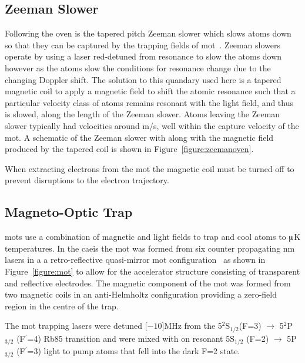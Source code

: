 \subsection{Zeeman Slower}
Following the oven is the tapered pitch Zeeman slower which slows atoms down so that they can be captured by the trapping fields of \gls{mot}~\cite{bell_slow_2010}.
Zeeman slowers operate by using a laser red-detuned from resonance to slow the atoms down however as the atoms slow the conditions for resonance change due to the changing Doppler shift.
The solution to this quandary used here is a tapered magnetic coil to apply a magnetic field to shift the atomic resonance such that a particular velocity class of atoms remains resonant with the light field, and thus is slowed, along the length of the Zeeman slower.
Atoms leaving the Zeeman slower typically had velocities around \unit[35]{m/s}, well within the capture velocity of the \gls{mot}.
A schematic of the Zeeman slower with along with the magnetic field produced by the tapered coil is shown in Figure~\ref{figure:zeemanoven}.

When extracting electrons from the \gls{mot} the magnetic coil must be turned off to prevent disruptions to the electron trajectory.

\subsection{Magneto-Optic Trap}
\Glspl{mot} use a combination of magnetic and light fields to trap and cool atoms to $\muup$K temperatures.
In the \gls{caeis} the \gls{mot} was formed from six counter propagating \unit[780]{nm} lasers in a a retro-reflective quasi-mirror \gls{mot} configuration~\cite{hanssen_using_2006,mcculloch_generation_2013} as shown in Figure~\ref{figure:mot} to allow for the accelerator structure consisting of transparent and reflective electrodes.
The magnetic component of the \gls{mot} was formed from two magnetic coils in an anti-Helmholtz configuration providing a zero-field region in the centre of the trap.

The \gls{mot} trapping lasers were detuned \unit[$-10$]{MHz} from the 5$^2$S$_{1/2} $(F=3) $\rightarrow$ 5$^2$P$_{3/2}$ (F$^\prime$=4) Rb85 transition and were mixed with on resonant 5S$_{1/2}$ (F=2) $\rightarrow$ 5P$_{3/2}$ (F$^\prime$=3) light to pump atoms that fell into the dark F=2 state.

